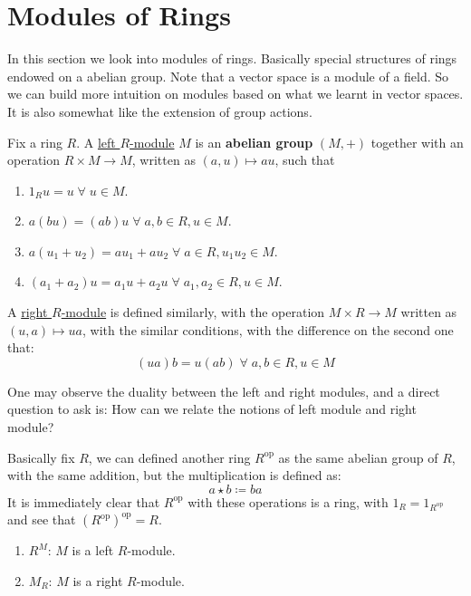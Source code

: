 \section{Modules of Rings}
In this section we look into modules of rings. Basically special structures of rings endowed on a
abelian group. Note that a vector space is a module of a field. So we can build more intuition on
modules based on what we learnt in vector spaces. It is also somewhat like the extension of group
actions.

\begin{definition}
	Fix a ring \( R \). A \underline{left \( R \)-module} \( M \) is an \textbf{abelian group} \( (M,+) \)
	together with an operation \( R\times M \to M \), written as \( (a,u) \mapsto au \), such that
	\begin{enumerate}
		\item \( 1_R u = u \; \forall \; u \in M \).
		\item \( a(bu) = (ab)u \; \forall \; a,b \in R, u\in M\).
		\item \( a(u_1 + u_2) = au_1 + au_2 \; \forall \; a\in R, u_1 u_2 \in M \).
		\item \( (a_1 + a_2)u = a_1 u + a_2 u \; \forall \; a_1, a_2 \in R, u\in M \).
	\end{enumerate}
	A \underline{right \( R \)-module} is defined similarly, with the operation \( M\times R \to M \)
	written as \( (u,a) \mapsto ua \), with the similar conditions, with the difference on the second
	one that:
	\[
		(ua)b = u(ab) \; \forall \; a,b \in R, u\in M
	\]
\end{definition}
One may observe the duality between the left and right modules, and a direct question to ask is: How
can we relate the notions of left module and right module?

Basically fix \( R \), we can defined another ring \( R^{\text{op}} \) as the same abelian group of
\( R \), with the same addition, but the multiplication is defined as:
\[
	a\star b \coloneqq  ba
\]
It is immediately clear that \( R^{\text{op}} \) with these operations is a ring, with \( 1_{R} =
1_{R^{\text{op}}} \) and see that \( (R^{\text{op}})^{\text{op}} = R \).

\begin{notation}
	\leavevmode
	\begin{enumerate}
		\item \( R^M \): \( M \) is a left \( R \)-module.
		\item \( M_R \): \( M \) is a right \( R \)-module.
	\end{enumerate}
\end{notation}

